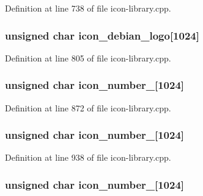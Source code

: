 Definition at line 738 of file icon-\/library.cpp.

\hypertarget{icon-library_8cpp_aa45b8bca2d3b388f48fa19f11ad1bb76}{
\subsubsection[{icon\_\-debian\_\-logo}]{\setlength{\rightskip}{0pt plus 5cm}unsigned char {\bf icon\_\-debian\_\-logo}\mbox{[}1024\mbox{]}}}
\label{icon-library_8cpp_aa45b8bca2d3b388f48fa19f11ad1bb76}


Definition at line 805 of file icon-\/library.cpp.

\hypertarget{icon-library_8cpp_a01cc14f08c8a16f5dac156df3bc46f65}{
\subsubsection[{icon\_\-number\_\-1}]{\setlength{\rightskip}{0pt plus 5cm}unsigned char {\bf icon\_\-number\_}\mbox{[}1024\mbox{]}}}
\label{icon-library_8cpp_a01cc14f08c8a16f5dac156df3bc46f65}


Definition at line 872 of file icon-\/library.cpp.

\hypertarget{icon-library_8cpp_a57f44f5bc4c0084b3bc620934cdb6523}{
\subsubsection[{icon\_\-number\_\-2}]{\setlength{\rightskip}{0pt plus 5cm}unsigned char {\bf icon\_\-number\_}\mbox{[}1024\mbox{]}}}
\label{icon-library_8cpp_a57f44f5bc4c0084b3bc620934cdb6523}


Definition at line 938 of file icon-\/library.cpp.

\hypertarget{icon-library_8cpp_a12352549200a87166239e25ecf86e49c}{
\subsubsection[{icon\_\-number\_\-3}]{\setlength{\rightskip}{0pt plus 5cm}unsigned char {\bf icon\_\-number\_}\mbox{[}1024\mbox{]}}}
\label{icon-library_8cpp_a12352549200a87166239e25ecf86e49c}


